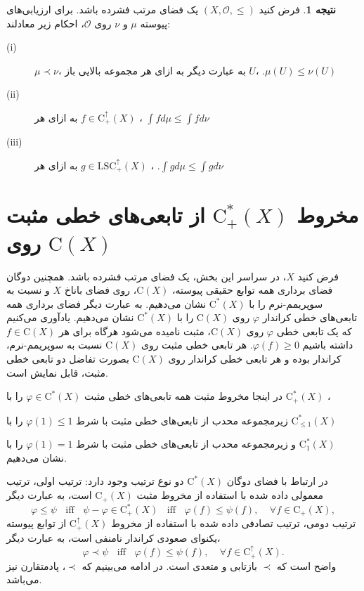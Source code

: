 \documentclass[12pt,a4paper]{article}
\theoremstyle{definition}
\theoremstyle{theorem}
\newtheorem{corollary}[definition]{نتیجه}
\theoremstyle{definition}
\newcommand{\cO}{\mathcal{O}}
\newcommand{\rC}{\mathrm{C}}
\newcommand{\ce}{\mathrm{C}^{*}(X)}
\begin{document}
\begin{corollary}\label{3.3}
فرض کنید 
$ (X,\cO,\leq) $
یک فضای مرتب فشرده باشد. برای ارزیابی‌های پیوسته 
$ \mu $
و
$ \nu $
روی
$ \cO $، احکام زیر معادلند:


\begin{description}
\item[(i)] 
$\mu\prec \nu$، به عبارت دیگر به ازای هر مجموعه بالایی باز 
$ U $،   $ .\mu(U)\leq \nu(U) $

\item[(ii)] 
به ازای هر 
$f\in \mathrm{C}_{+}^{\uparrow}(X) $%
،
$\int{f}d\mu\leq \int{f}d\nu$
\item[(iii)] 
به ازای هر 
$g\in \mathrm{LSC}_{+}^{\uparrow}(X)$%
،
$.\int{g}d\mu\leq \int{g}d\nu$
\end{description}

\end{corollary}
\section{مخروط  $\mathrm{C}_{+}^{*}(X)$ از تابعی‌های خطی مثبت روی  $\mathrm{C}(X)$}
فرض کنید 
$ X $،    در سراسر این بخش، یک فضای مرتب فشرده باشد. همچنین  دوگان  فضای برداری همه توابع حقیقی پیوسته، $\rC(X)$،     روی فضای باناخ
$ X $ 
 و نسبت به سوپریمم-نرم را با
$ \ce $\index{$ \ce $}
نشان می‌دهیم.  به عبارت دیگر فضای برداری همه تابعی‌های خطی کراندار 
$ \varphi $
روی 
$ \rC(X) $
را با
$ \ce $
نشان می‌دهیم. یادآوری می‌کنیم که یک تابعی خطی 
$ \varphi $
روی 
$ \rC(X) $، مثبت
نامیده می‌شود هرگاه برای هر 
$ f\in \rC(X) $
داشته باشیم
$ \varphi(f)\geq 0 $. هر تابعی خطی مثبت روی 
$ \rC(X) $
نسبت به سوپریمم-نرم، کراندار بوده و هر تابعی خطی کراندار روی 
$ \rC(X) $
بصورت تفاضل دو تابعی خطی مثبت،   قابل نمایش است. 

در اینجا مخروط مثبت همه تابعی‌های خطی مثبت
$ \varphi \in \ce $
را با 
$ \mathrm{C}_{+}^{*}(X) $%
،

زیرمجموعه محدب از تابعی‌های خطی مثبت با شرط
$ \varphi(1)\leq 1 $
را با 
$ \mathrm{C}_{\leq1}^{*}(X) $
 
و زیرمجموعه محدب از تابعی‌های خطی مثبت با شرط 
$ \varphi(1)=1 $
را با 
$ \mathrm{C}_{1}^{*}(X) $\\
نشان می‌دهیم. 

در ارتباط با فضای دوگان
$ \ce $
دو نوع ترتیب وجود دارد: ترتیب اولی، ترتیب معمولی داده شده با استفاده از مخروط مثبت 
$ \rC_{+}(X) $
است، به عبارت دیگر 
$$ \varphi\leq\psi  \ \ \ \ \text{iff} \ \ \ \ \psi-\varphi\in \mathrm{C}_{+}^{*}(X)   \ \ \ \ \text{iff} \ \ \ \  \varphi(f)\leq \psi(f) , \ \  \ \ \ \forall f\in \rC_{+}(X) ,  $$
ترتیب دومی، ترتیب تصادفی داده شده با استفاده از مخروط
$\mathrm{C}_{+}^{\uparrow}(X)$
از توابع پیوسته یکنوای صعودی   کراندار نامنفی است، به عبارت دیگر، 
$$ \varphi\prec \psi \ \ \ \ \text{iff} \ \ \ \ \varphi(f)\leq \psi(f) , \ \  \ \ \ \forall f\in \rC_{+}^{\uparrow}(X) . $$
واضح است که 
$ \prec $
بازتابی و متعدی است. در ادامه می‌بینیم که 
$ \prec $،  پادمتقارن نیز می‌باشد. 
\end{document}
